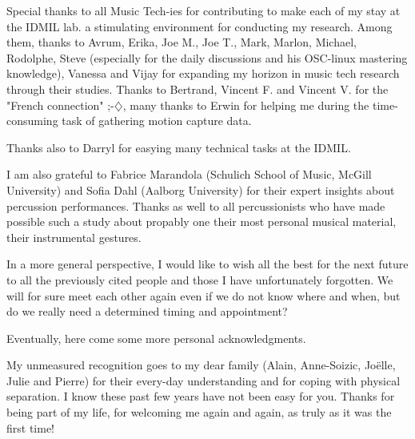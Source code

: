 \documentclass[twoside, a4paper, 12pt]{book}
\begin{document}
{Special thanks to all Music Tech-ies for contributing to make each of my stay at the IDMIL lab. a stimulating environment for conducting my research. Among them, thanks to Avrum, Erika, Joe M., Joe T., Mark, Marlon, Michael, Rodolphe, Steve (especially for the daily discussions and his OSC-linux mastering knowledge), Vanessa and Vijay for expanding my horizon in music tech research through their studies. Thanks to Bertrand, Vincent F. and Vincent V. for the "French connection" ;-$\diamondsuit$, many thanks to Erwin for helping me during the time-consuming task of gathering motion capture data.

Thanks also to Darryl for easying many technical tasks at the IDMIL.\\

\vspace{0.25cm}

I am also grateful to Fabrice Marandola (Schulich School of Music, McGill University) and Sofia Dahl (Aalborg University) for their expert insights about percussion performances. Thanks as well to all percussionists who have made possible such a study about propably one their most personal musical material, their instrumental gestures.\\

\vspace{0.25cm}

In a more general perspective, I would like to wish all the best for the next future to all the previously cited people and those I have unfortunately forgotten. We will for sure meet each other again even if we do not know where and when, but do we really need a determined timing and appointment?\\

\noindent{------}
\vspace{0.5cm}

Eventually, here come some more personal acknowledgments.\\
\vspace{0.25cm}

My unmeasured recognition goes to my dear family (Alain, Anne-Soizic, Jo{\"e}lle, Julie and Pierre) for their every-day understanding and for coping with physical separation. I know these past few years have not been easy for you. Thanks for being part of my life, for welcoming me again and again, as truly as it was the first time!\\

\vspace{0.25cm}

}
\end{document}

